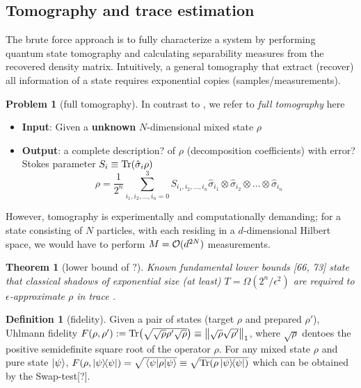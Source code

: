 \documentclass[
10pt,
aps,
pra,
linenumbers,
floatfix,
]{revtex4-2}
\theoremstyle{plain}
\newtheorem{theorem}{Theorem}
\theoremstyle{definition}
\newtheorem{definition}{Definition}
\newtheorem{problem}{Problem}
\newcommand{\dm}{\rho}
\begin{document}
\subsection{Tomography and trace estimation}
The brute force approach is to fully characterize a system by performing quantum state tomography and calculating separability measures from the recovered density matrix.
Intuitively, a general tomography \cite{altepeterPhotonicStateTomography2005} that extract (recover) all information of a state requires exponential copies (samples/measurements).
\begin{problem}[full tomography]\label{prm:full_tomography}
	In contrast to , we refer to \emph{full tomography} here
	\begin{itemize}
		\item \textbf{Input}: Given a \textbf{unknown} $N$-dimensional mixed state $\dm$
		\item \textbf{Output}: a complete description? of $\dm$ (decomposition coefficients) with error?
		Stokes parameter $S_i\equiv \Tr(\hat{\sigma}_i \dm)$
		\begin{equation}
			\dm = \frac{1}{2^n} \sum_{i_1,i_2,\dots,i_n=0}^3
			S_{i_1,i_2,\dots,i_n} 
			\hat{\sigma}_{i_1} \otimes \hat{\sigma}_{i_2} \otimes \dots \otimes \hat{\sigma}_{i_n} 
			\label{eq:stokes_tomography}
		\end{equation}
	\end{itemize}
\end{problem}
However, tomography is experimentally and computationally demanding; for a state consisting of $N$ particles, with each residing in a $d$-dimensional Hilbert space, we would have to perform $M = \mathcal{O}(d^{2N})$ measurements.
\begin{theorem}[lower bound of ?\cite{haahSampleoptimalTomographyQuantum2017}]
	Known fundamental lower bounds [66, 73] state that classical shadows of exponential size (at least) $T = \Omega( 2^n / \epsilon^2)$ are required to $\epsilon$-approximate $\dm$ in trace .
\end{theorem}
\begin{definition}[fidelity]\label{def:fidelity}
	Given a pair of states (target $\dm$ and prepared $\dm'$), 
	Uhlmann fidelity $F(\dm,\dm') : = \Tr(\sqrt{\sqrt{\dm}\dm'\sqrt{\dm}})\equiv\norm{\sqrt{\dm}\sqrt{\dm'}}_1$, where $\sqrt{\dm}$ dentoes the positive semidefinite square root of the operator $\dm$.
	For any mixed state $\rho$ and pure state $\ket{\psi}$, $F(\dm,\op{\psi})=\sqrt{\mel{\psi}{\dm}{\psi}}\equiv \sqrt{\Tr(\dm\op{\psi})}$ which can be obtained by the Swap-test[?].
\end{definition}
\end{document}

